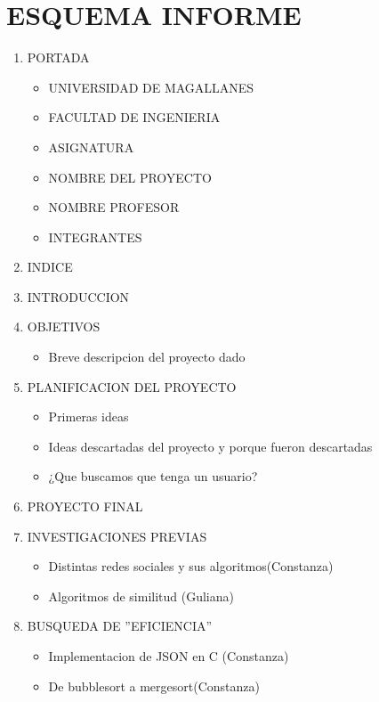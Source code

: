 \section*{ESQUEMA INFORME}
\begin{enumerate}
    \item PORTADA
        \begin{itemize}
            \item UNIVERSIDAD DE MAGALLANES
            \item FACULTAD DE INGENIERIA
            \item ASIGNATURA
            \item NOMBRE DEL PROYECTO
            \item NOMBRE PROFESOR
            \item INTEGRANTES
        \end{itemize}
    \item INDICE
    \item INTRODUCCION
    \item OBJETIVOS
        \begin{itemize}
            \item Breve descripcion del proyecto dado
        \end{itemize}
    \item PLANIFICACION DEL PROYECTO
        \begin{itemize}
            \item Primeras ideas
            \item Ideas descartadas del proyecto y porque fueron descartadas
            \item ¿Que buscamos que tenga un usuario?
        \end{itemize}
    \item  PROYECTO FINAL
    \item INVESTIGACIONES PREVIAS
        \begin{itemize}
            \item Distintas redes sociales y sus algoritmos(Constanza)
            \item Algoritmos de similitud (Guliana)
        \end{itemize}
    \item BUSQUEDA DE ''EFICIENCIA''
        \begin{itemize}
            \item Implementacion de JSON en C (Constanza)
            \item De bubblesort a mergesort(Constanza)
        \end{itemize}

\end{enumerate}

